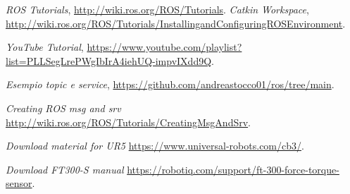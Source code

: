 \begin{thebibliography}{99}
    
 \textit{ROS Tutorials}, \url{http://wiki.ros.org/ROS/Tutorials}.
 \textit{Catkin Workspace}, \url{http://wiki.ros.org/ROS/Tutorials/InstallingandConfiguringROSEnvironment}.

 \textit{YouTube Tutorial}, \url{https://www.youtube.com/playlist?list=PLLSegLrePWgIbIrA4iehUQ-impvIXdd9Q}.

 \textit{Esempio topic e service}, \url{https://github.com/andreastocco01/ros/tree/main}.

 \textit{Creating ROS msg and srv} \url{http://wiki.ros.org/ROS/Tutorials/CreatingMsgAndSrv}.

 \textit{Download material for UR5} \url{https://www.universal-robots.com/cb3/}.

 \textit{Download FT300-S manual} \url{https://robotiq.com/support/ft-300-force-torque-sensor}.
\end{thebibliography}